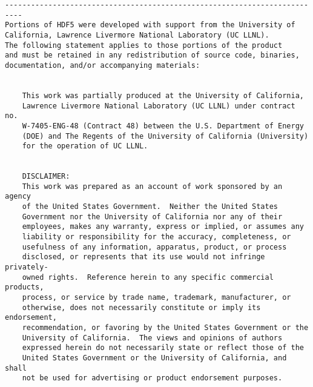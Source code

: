 \begin{verbatim}
--------------------------------------------------------------------------
Portions of HDF5 were developed with support from the University of 
California, Lawrence Livermore National Laboratory (UC LLNL).
The following statement applies to those portions of the product
and must be retained in any redistribution of source code, binaries,
documentation, and/or accompanying materials:


    This work was partially produced at the University of California,
    Lawrence Livermore National Laboratory (UC LLNL) under contract no.
    W-7405-ENG-48 (Contract 48) between the U.S. Department of Energy 
    (DOE) and The Regents of the University of California (University) 
    for the operation of UC LLNL.


    DISCLAIMER:
    This work was prepared as an account of work sponsored by an agency 
    of the United States Government.  Neither the United States 
    Government nor the University of California nor any of their 
    employees, makes any warranty, express or implied, or assumes any 
    liability or responsibility for the accuracy, completeness, or 
    usefulness of any information, apparatus, product, or process 
    disclosed, or represents that its use would not infringe privately-
    owned rights.  Reference herein to any specific commercial products, 
    process, or service by trade name, trademark, manufacturer, or 
    otherwise, does not necessarily constitute or imply its endorsement, 
    recommendation, or favoring by the United States Government or the 
    University of California.  The views and opinions of authors 
    expressed herein do not necessarily state or reflect those of the 
    United States Government or the University of California, and shall 
    not be used for advertising or product endorsement purposes.

\end{verbatim}

